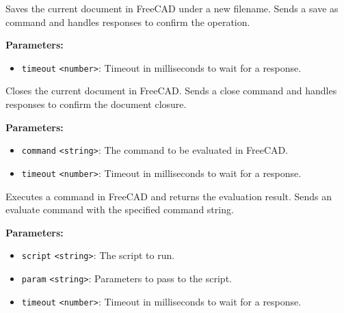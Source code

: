 \documentclass[12pt,a4paper]{article}
\begin{document}
\noindent Saves the current document in FreeCAD under a new filename.
Sends a save as command and handles responses to confirm the operation.

\vspace{5mm}
\noindent {}


\noindent \textbf{Parameters:}
\begin{itemize}
  \item \texttt{timeout} \texttt{<number>}: Timeout in milliseconds to wait for a response.
\end{itemize}

\noindent Closes the current document in FreeCAD.
Sends a close command and handles responses to confirm the document closure.

\vspace{5mm}
\noindent {}


\noindent \textbf{Parameters:}
\begin{itemize}
  \item \texttt{command} \texttt{<string>}: The command to be evaluated in FreeCAD.
  \item \texttt{timeout} \texttt{<number>}: Timeout in milliseconds to wait for a response.
\end{itemize}

\noindent Executes a command in FreeCAD and returns the evaluation result.
Sends an evaluate command with the specified command string.

\vspace{5mm}
\noindent {}


\noindent \textbf{Parameters:}
\begin{itemize}
  \item \texttt{script} \texttt{<string>}: The script to run.
  \item \texttt{param} \texttt{<string>}: Parameters to pass to the script.
  \item \texttt{timeout} \texttt{<number>}: Timeout in milliseconds to wait for a response.
\end{itemize}
\end{document}
